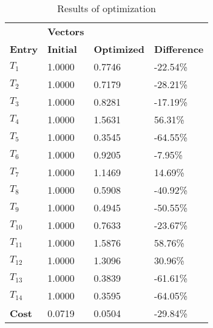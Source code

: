 \begin{table}[H]
\centering
\begin{tabular}{llll}
\textbf{}      & \cellcolor[HTML]{EFEFEF}\textbf{Vectors} & \textbf{} & \textbf{}         \\
\rowcolor[HTML]{EFEFEF} 
\textbf{Entry} & \textbf{Initial} & \textbf{Optimized} & \textbf{Difference} \\
$T_1$ & 1.0000 & 0.7746 & -22.54\% \\ 
$T_2$ & 1.0000 & 0.7179 & -28.21\% \\ 
$T_3$ & 1.0000 & 0.8281 & -17.19\% \\ 
$T_4$ & 1.0000 & 1.5631 & 56.31\% \\ 
$T_5$ & 1.0000 & 0.3545 & -64.55\% \\ 
$T_6$ & 1.0000 & 0.9205 & -7.95\% \\ 
$T_7$ & 1.0000 & 1.1469 & 14.69\% \\ 
$T_8$ & 1.0000 & 0.5908 & -40.92\% \\ 
$T_9$ & 1.0000 & 0.4945 & -50.55\% \\ 
$T_10$ & 1.0000 & 0.7633 & -23.67\% \\ 
$T_11$ & 1.0000 & 1.5876 & 58.76\% \\ 
$T_12$ & 1.0000 & 1.3096 & 30.96\% \\ 
$T_13$ & 1.0000 & 0.3839 & -61.61\% \\ 
$T_14$ & 1.0000 & 0.3595 & -64.05\% \\ 
\rowcolor[HTML]{EFEFEF} 
\textbf{Cost}  & 0.0719 & 0.0504 & -29.84\% \\ 
\end{tabular}
\caption{Results of optimization}
\label{tab:OptimizationAnalysis}
\end{table}